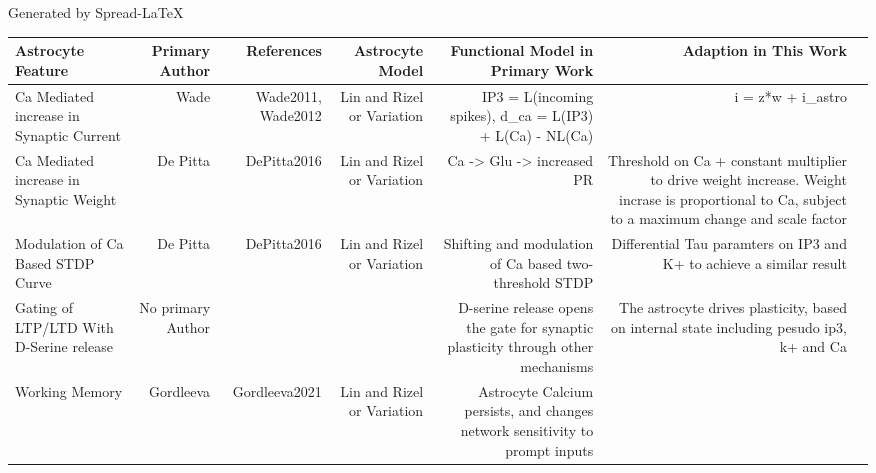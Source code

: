 \begin{adjustwidth}{-2.5 cm}{-2.5 cm}\centering\begin{threeparttable}[!htb]
\caption{Generated by Spread-LaTeX}\label{table:obj2_astro_features}
\scriptsize
\begin{tabular}{lrrrrrr}\toprule
Astrocyte Feature &Primary Author &References &Astrocyte Model &Functional Model in Primary Work &Adaption in This Work \\\midrule
Ca Mediated increase in Synaptic Current &Wade &Wade2011, Wade2012 &Lin and Rizel or Variation &IP3 = L(incoming spikes), d\_ca = L(IP3) + L(Ca) - NL(Ca) &i = z*w + i\_astro \\
Ca Mediated increase in Synaptic Weight &De Pitta &DePitta2016 &Lin and Rizel or Variation &Ca -> Glu -> increased PR &Threshold on Ca + constant multiplier to drive weight increase. Weight incrase is proportional to Ca, subject to a maximum change and scale factor \\
Modulation of Ca Based STDP Curve &De Pitta &DePitta2016 &Lin and Rizel or Variation &Shifting and modulation of Ca based two-threshold STDP &Differential Tau paramters on IP3 and K+ to achieve a similar result \\
Gating of LTP/LTD With D-Serine release &No primary Author & & &D-serine release opens the gate for synaptic plasticity through other mechanisms &The astrocyte drives plasticity, based on internal state including pesudo ip3, k+ and Ca \\
Working Memory &Gordleeva &Gordleeva2021 &Lin and Rizel or Variation &Astrocyte Calcium persists, and changes network sensitivity to prompt inputs & \\
\bottomrule
\end{tabular}
\end{threeparttable}\end{adjustwidth}


